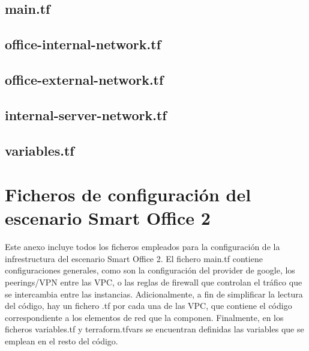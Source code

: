 \section*{main.tf} 


\section*{office-internal-network.tf}


\section*{office-external-network.tf}

\clearpage

\section*{internal-server-network.tf}

\clearpage

\section*{variables.tf}


\chapter{Ficheros de configuración del escenario Smart Office 2} \label{anx:soII}
  Este anexo incluye todos los ficheros empleados para la configuración de la infrestructura del escenario Smart Office 2. El fichero main.tf contiene configuraciones generales, como son la configuración del provider de google, los peerings/VPN entre las VPC, o las reglas de firewall que controlan el tráfico que se intercambia entre las instancias. Adicionalmente, a fin de simplificar la lectura del código, hay un fichero .tf por cada una de las VPC, que contiene el código correspondiente a los elementos de red que la componen. Finalmente, en los ficheros variables.tf y terraform.tfvars se encuentran definidas las variables que se emplean en el resto del código.

